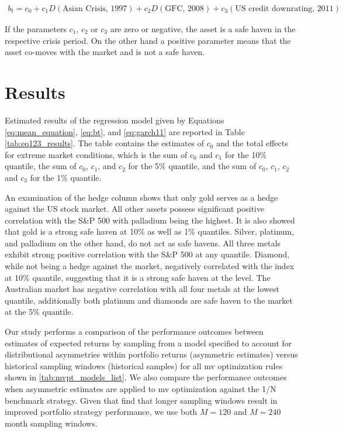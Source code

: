 \documentclass[preprint,authoryear,11pt]{elsarticle}
\begin{document}
\begin{align}
	 b_{t} = c_{0} + c_{1}D(\text{Asian Crisis, 1997}) + c_{2}D(\text{GFC, 2008}) + c_{3}(\text{US credit downrating, 2011}) \label{eq:crisis}
\end{align}

If the parameters $c_{1}$, $c_{2}$ or $c_{3}$ are zero or negative, the asset is a safe haven in the respective crisis period. On the other hand a positive parameter means that the asset co-moves with the market and is not a safe haven. \newline

\section{Results}
\label{sec:results}

Estimated results of the regression model given by Equations \eqref{eq:mean_equation}, \eqref{eq:bt}, and \eqref{eq:garch11} are reported in Table \ref{tab:eq123_results}. The table contains the estimates of $c_{0}$ and the total effects for extreme market conditions, which is the sum of $c_{0}$ and $c_{1}$ for the 10\% quantile, the sum of $c_{0}$, $c_{1}$, and $c_{2}$ for the 5\% quantile, and the sum of $c_{0}$, $c_{1}$, $c_{2}$ and $c_{3}$ for the 1\% quantile.

An examination of the hedge column shows that only gold serves as a hedge against the US stock market. All other assets possess significant positive correlation with the S\&P 500 with palladium being the highest. It is also showed that gold is a strong safe haven at 10\% as well as 1\% quantiles. Silver, platinum, and palladium on the other hand, do not act as safe havens. All three metals exhibit strong positive correlation with the S\&P 500 at any quantile. Diamond, while not being a hedge against the market, negatively correlated with the index at 10\% quantile, suggesting that it is a strong safe haven at the level. The Australian market has negative correlation with all four metals at the lowest quantile, additionally both platinum and diamonds are safe haven to the market at the 5\% quantile.

Our study performs a comparison of the performance outcomes between estimates
of expected returns by sampling from a model specified to account for
distributional asymmetries within portfolio returns (asymmetric estimates)
versus historical sampling windows (historical samples) for all \gls{mv}
optimization rules shown in \autoref{tab:mvpt_models_list}.  We also compare
the performance outcomes when asymmetric estimates are applied to \gls{mv}
optimization against the \gls{1/N} benchmark strategy.  Given that
\citet{tu2011} find that longer sampling windows result in improved portfolio
strategy performance, we use both $M=120$ and $M=240$ month sampling windows.
\end{document}
